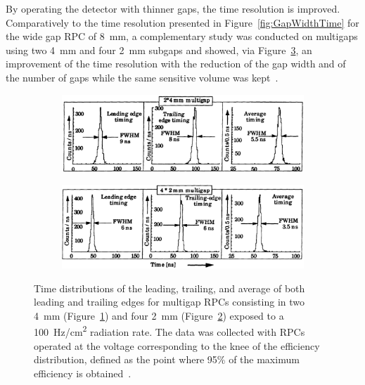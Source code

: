 	By operating the detector with thinner gaps, the time resolution is improved. Comparatively to the time resolution presented in Figure~\ref{fig:GapWidthTime} for the wide gap RPC of \SI{8}{mm}, a complementary study was conducted on multigaps using two \SI{4}{mm} and four \SI{2}{mm} subgaps and showed, via Figure~\ref{fig:MRPCTimeRes}, an improvement of the time resolution with the reduction of the gap width and of the number of gaps while the same sensitive volume was kept~\cite{WILLIAMS98}.
	
	\begin{figure}[H]
		\begin{subfigure}{\linewidth}
			\centering
			\includegraphics[width = \plotwidth]{fig/chapt4/MRPC-2-4mm-time-res.png}
			\caption{\label{fig:MRPCTimeRes:A}}
		\end{subfigure}
		\begin{subfigure}{\linewidth}
			\centering
			\includegraphics[width = \plotwidth]{fig/chapt4/MRPC-4-2mm-time-res.png}
			\caption{\label{fig:MRPCTimeRes:B}}
		\end{subfigure}
		\caption{\label{fig:MRPCTimeRes} Time distributions of the leading, trailing, and average of both leading and trailing edges for multigap RPCs consisting in two \SI{4}{mm} (Figure~\ref{fig:MRPCTimeRes:A}) and four \SI{2}{mm} (Figure~\ref{fig:MRPCTimeRes:B}) exposed to a \SI{100}{Hz/cm^2} radiation rate. The data was collected with RPCs operated at the voltage corresponding to the knee of the efficiency distribution, defined as the point where 95\% of the maximum efficiency is obtained~\cite{WILLIAMS98}.}
	\end{figure}
	
